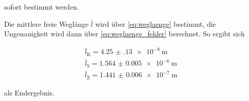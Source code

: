 sofort bestimmt werden.

Die mittlere freie Weglänge $\bar{l}$ wird über \autoref{eq:weglaenge} bestimmt, die Ungenauigkeit wird dann über \autoref{eq:weglaenge_fehler} berechnet.
So ergibt sich

\begin{align}
    \bar{l}_\text{K} = \SI{4.25(13)e-8}{\meter}\\
    \bar{l}_\text{S} = \SI{1.564(5)e-6}{\meter}\\
    \bar{l}_\text{Z} = \SI{1.441(6)e-7}{\meter}
    \label{eq:weglaenge2}
\end{align}

als Endergebnis.